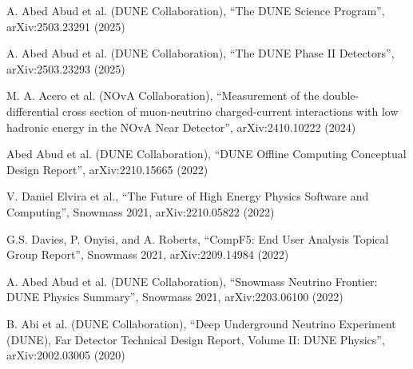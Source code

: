 \begin{list2}
\item A. Abed Abud et al. (DUNE Collaboration), ``The DUNE Science Program'', arXiv:2503.23291 (2025)
\item A. Abed Abud et al. (DUNE Collaboration), ``The DUNE Phase II Detectors'', arXiv:2503.23293 (2025)
\item M. A. Acero et al. (NOvA Collaboration), ``Measurement of the double-differential cross section of muon-neutrino charged-current interactions with low hadronic energy in the NOvA Near Detector'', arXiv:2410.10222 (2024)
\item Abed Abud et al. (DUNE Collaboration), ``DUNE Offline Computing Conceptual Design Report'', arXiv:2210.15665 (2022)
\item V. Daniel Elvira et al., ``The Future of High Energy Physics Software and Computing'', Snowmass 2021, arXiv:2210.05822 (2022)
\item G.S. Davies, P. Onyisi, and A. Roberts, ``CompF5: End User Analysis Topical Group Report'', Snowmass 2021, arXiv:2209.14984 (2022)
\item A. Abed Abud et al. (DUNE Collaboration), ``Snowmass Neutrino Frontier: DUNE Physics Summary'', Snowmass 2021, arXiv:2203.06100 (2022)
\item B. Abi et al. (DUNE Collaboration), ``Deep Underground Neutrino Experiment (DUNE), Far Detector Technical Design Report, Volume II: DUNE Physics'', arXiv:2002.03005 (2020)
\end{list2}
